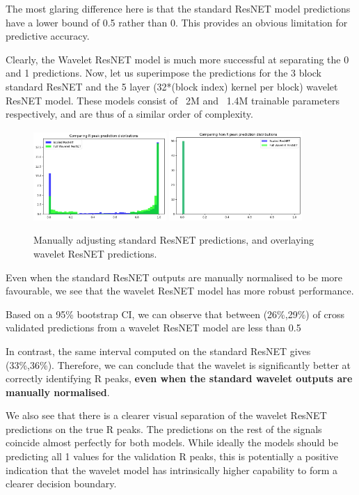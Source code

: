 \documentclass[9pt,conference]{IEEEtran}
\begin{document}
The most glaring difference here is that the standard ResNET model predictions have a lower bound of 0.5 rather than 0. This provides an obvious limitation for predictive accuracy.

Clearly, the Wavelet ResNET model is much more successful at separating the 0 and 1 predictions. Now, let us superimpose the predictions for the 3 block standard ResNET and the 5 layer (32*(block index)  kernel per block) wavelet ResNET model. These models consist of ~2M and ~1.4M trainable parameters respectively, and are thus of a similar order of complexity.

\begin{figure}[H]
    \centering
    \includegraphics[width=0.45\textwidth]{compRESNETWAVELET.png}
    \includegraphics[width=0.45\textwidth]{compRESNETWAVELET_nonr.png}
    \caption{Manually adjusting standard ResNET predictions, and overlaying wavelet ResNET predictions.}
\end{figure}

Even when the standard ResNET outputs are manually normalised to be more favourable, we see that the wavelet ResNET model has more robust performance.

Based on a 95\% bootstrap CI, we can observe that between (26\%,29\%) of cross validated predictions from a wavelet ResNET model are less than 0.5

In contrast, the same interval computed on the standard ResNET gives (33\%,36\%). Therefore, we can conclude that the wavelet is significantly better at correctly identifying R peaks, \textbf{even when the standard wavelet outputs are manually normalised}.

We also see that there is a clearer visual separation of the wavelet ResNET predictions on the true R peaks. The predictions on the rest of the signals coincide almost perfectly for both models. While ideally the models should be predicting all 1 values for the validation R peaks, this is potentially a positive indication that the wavelet model has intrinsically higher capability to form a clearer decision boundary.
\end{document}
